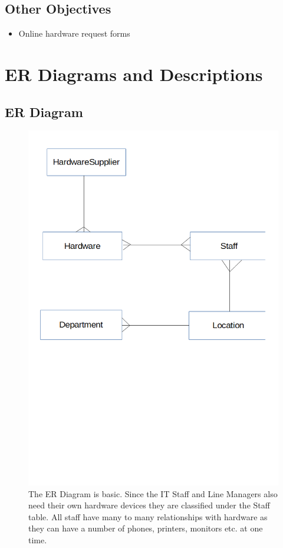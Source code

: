 \subsection{Other Objectives}

\begin{itemize}
\item Online hardware request forms
\end{itemize}

\section{ER Diagrams and Descriptions}

\subsection{ER Diagram}

\begin{figure}[H]
\hspace*{-2cm}
\vspace*{5cm}
\setlength{\abovecaptionskip}{-320pt plus 3pt minus 2pt}
\includegraphics[width=1.2\textwidth]{ERDiagram.png}
\caption{The ER Diagram is basic. Since the IT Staff and Line Managers also need their own hardware devices they are classified under the Staff table. All staff have many to many relationships with hardware as they can have a number of phones, printers, monitors etc. at one time.} \label{ER Diagram}
\end{figure}

